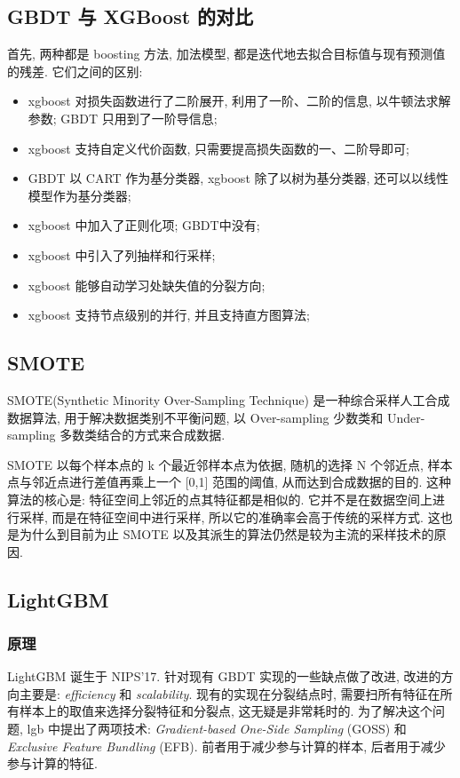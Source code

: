 \subsection{GBDT 与 XGBoost 的对比}
首先, 两种都是 boosting 方法, 加法模型, 都是迭代地去拟合目标值与现有预测值的残差. 它们之间的区别: 
\begin{itemize}
	\item xgboost 对损失函数进行了二阶展开, 利用了一阶、二阶的信息, 以牛顿法求解参数; GBDT 只用到了一阶导信息; 
	
	\item xgboost 支持自定义代价函数, 只需要提高损失函数的一、二阶导即可; 
	
	\item GBDT 以 CART 作为基分类器, xgboost 除了以树为基分类器, 还可以以线性模型作为基分类器; 
	
	\item xgboost 中加入了正则化项; GBDT中没有; 
	
	\item xgboost 中引入了列抽样和行采样; 
	
	\item xgboost 能够自动学习处缺失值的分裂方向; 
	
	\item xgboost 支持节点级别的并行, 并且支持直方图算法; 
\end{itemize}

\subsection{SMOTE}
SMOTE(Synthetic Minority Over-Sampling Technique) 是一种综合采样人工合成数据算法, 用于解决数据类别不平衡问题, 以 Over-sampling 少数类和 Under-sampling 多数类结合的方式来合成数据. 

SMOTE 以每个样本点的 k 个最近邻样本点为依据, 随机的选择 N 个邻近点, 样本点与邻近点进行差值再乘上一个 [0,1] 范围的阈值, 从而达到合成数据的目的. 这种算法的核心是: 特征空间上邻近的点其特征都是相似的. 它并不是在数据空间上进行采样, 而是在特征空间中进行采样, 所以它的准确率会高于传统的采样方式. 这也是为什么到目前为止 SMOTE 以及其派生的算法仍然是较为主流的采样技术的原因. 

\subsection{LightGBM}
\subsubsection{原理}
LightGBM\cite{guo_nips_2017} 诞生于 NIPS'17. 针对现有 GBDT 实现的一些缺点做了改进, 改进的方向主要是: \textit{efficiency} 和 \textit{scalability}. 现有的实现在分裂结点时, 需要扫所有特征在所有样本上的取值来选择分裂特征和分裂点, 这无疑是非常耗时的. 为了解决这个问题, lgb 中提出了两项技术: \textit{Gradient-based One-Side Sampling} (GOSS) 和 \textit{Exclusive Feature Bundling} (EFB). 前者用于减少参与计算的样本, 后者用于减少参与计算的特征.

